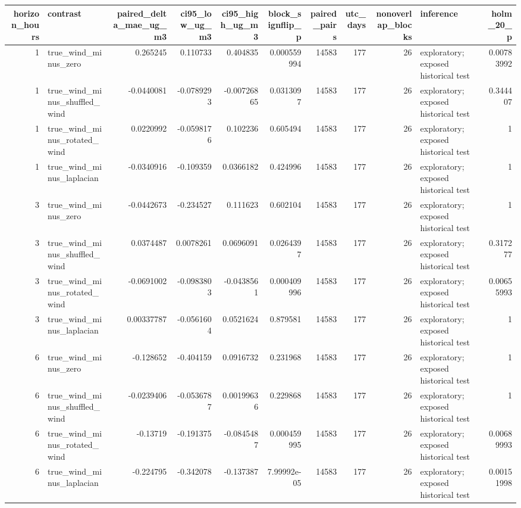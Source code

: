\begin{tabular}{rlrrrrrrrlr}
\hline
horizon\_hours & contrast & paired\_delta\_mae\_ug\_m3 & ci95\_low\_ug\_m3 & ci95\_high\_ug\_m3 & block\_signflip\_p & paired\_pairs & utc\_days & nonoverlap\_blocks & inference & holm\_20\_p \\
\hline
1 & true\_wind\_minus\_zero & 0.265245 & 0.110733 & 0.404835 & 0.000559994 & 14583 & 177 & 26 & exploratory; exposed historical test & 0.00783992 \\
1 & true\_wind\_minus\_shuffled\_wind & -0.0440081 & -0.0789293 & -0.00726865 & 0.0313097 & 14583 & 177 & 26 & exploratory; exposed historical test & 0.344407 \\
1 & true\_wind\_minus\_rotated\_wind & 0.0220992 & -0.0598176 & 0.102236 & 0.605494 & 14583 & 177 & 26 & exploratory; exposed historical test & 1 \\
1 & true\_wind\_minus\_laplacian & -0.0340916 & -0.109359 & 0.0366182 & 0.424996 & 14583 & 177 & 26 & exploratory; exposed historical test & 1 \\
3 & true\_wind\_minus\_zero & -0.0442673 & -0.234527 & 0.111623 & 0.602104 & 14583 & 177 & 26 & exploratory; exposed historical test & 1 \\
3 & true\_wind\_minus\_shuffled\_wind & 0.0374487 & 0.0078261 & 0.0696091 & 0.0264397 & 14583 & 177 & 26 & exploratory; exposed historical test & 0.317277 \\
3 & true\_wind\_minus\_rotated\_wind & -0.0691002 & -0.0983803 & -0.0438561 & 0.000409996 & 14583 & 177 & 26 & exploratory; exposed historical test & 0.00655993 \\
3 & true\_wind\_minus\_laplacian & 0.00337787 & -0.0561604 & 0.0521624 & 0.879581 & 14583 & 177 & 26 & exploratory; exposed historical test & 1 \\
6 & true\_wind\_minus\_zero & -0.128652 & -0.404159 & 0.0916732 & 0.231968 & 14583 & 177 & 26 & exploratory; exposed historical test & 1 \\
6 & true\_wind\_minus\_shuffled\_wind & -0.0239406 & -0.0536787 & 0.00199636 & 0.229868 & 14583 & 177 & 26 & exploratory; exposed historical test & 1 \\
6 & true\_wind\_minus\_rotated\_wind & -0.13719 & -0.191375 & -0.0845487 & 0.000459995 & 14583 & 177 & 26 & exploratory; exposed historical test & 0.00689993 \\
6 & true\_wind\_minus\_laplacian & -0.224795 & -0.342078 & -0.137387 & 7.99992e-05 & 14583 & 177 & 26 & exploratory; exposed historical test & 0.00151998 \\

\end{tabular}

